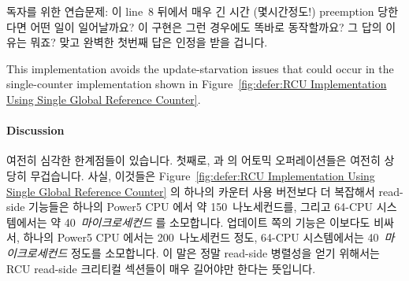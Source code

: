 {	독자를 위한 연습문제:  이 line~8 뒤에서 매우 긴
	시간 (몇시간정도!) preemption 당한다면 어떤 일이 일어날까요?
	이 구현은 그런 경우에도 똑바로 동작할까요?
	그 답의 이유는 뭐죠?
	맞고 완벽한 첫번째 답은 인정을 받을 겁니다.
	\iffalse

	Exercise for the reader: What happens if \co{rcu_read_lock()}
	is preempted for a very long time (hours!) just after
	line~8?
	Does this implementation operate correctly in that case?
	Why or why not?
	The first correct and complete response will be credited.
	\fi
} \QuickQuizEnd
\iffalse

이 구현은
Figure~\ref{fig:defer:RCU Implementation Using Single Global Reference Counter}
에서 보인 단일 카운터 구현에서 일어날 수 있는
업데이트 쪽의 starvation 문제를 배제합니다.
\fi

This implementation avoids the update-starvation issues that could
occur in the single-counter implementation shown in
Figure~\ref{fig:defer:RCU Implementation Using Single Global Reference Counter}.

\paragraph{Discussion}

여전히 심각한 한계점들이 있습니다.
첫째로,  과  의 어토믹 오퍼레이션들은
여전히 상당히 무겁습니다.
사실, 이것들은
Figure~\ref{fig:defer:RCU Implementation Using Single Global Reference Counter}
의 하나의 카운터 사용 버전보다 더 복잡해서 read-side 기능들은 하나의 Power5 CPU
에서 약 150~나노세컨드를, 그리고 64-CPU 시스템에서는 약
40~\emph{마이크로세컨드} 를 소모합니다.
업데이트 쪽의  기능은 이보다도 비싸서, 하나의 Power5 CPU
에서는 200~나노세컨드 정도, 64-CPU 시스템에서는 40~\emph{마이크로세컨드} 정도를
소모합니다.
이 말은 정말 read-side 병렬성을 얻기 위해서는 RCU read-side 크리티컬 섹션들이
매우 길어야만 한다는 뜻입니다.
\iffalse

There are still some serious shortcomings.
First, the atomic operations in \co{rcu_read_lock()}
and \co{rcu_read_unlock()}
are still quite heavyweight.
In fact, they are more complex than those
of the single-counter variant shown in
Figure~\ref{fig:defer:RCU Implementation Using Single Global Reference Counter},
with the read-side primitives consuming about 150~nanoseconds on a single
Power5 CPU and almost 40~\emph{microseconds} on a 64-CPU system.
The updates-side \co{synchronize_rcu()} primitive is more costly as
well, ranging from about 200~nanoseconds on a single Power5 CPU to
more than 40~\emph{microseconds} on a 64-CPU system.
This means that the RCU read-side critical sections
have to be extremely long in order to get any real
read-side parallelism.
\fi

